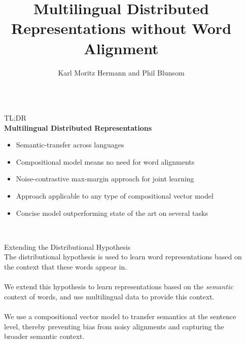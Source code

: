 \documentclass[final]{beamer}
\title{Multilingual Distributed Representations without Word Alignment} %
\author{Karl Moritz Hermann and Phil Blunsom} %
\institute{Department of Computer Science, University of Oxford} %
\newlength{\sepwid}
\newlength{\onecolwid}
\begin{document}

\setlength{\belowcaptionskip}{2ex} %
\setlength\belowdisplayshortskip{2ex} %

\renewcommand{\arraystretch}{1.2} %

\begin{frame}[t] %
  \begin{columns}[t] %
  \begin{column}{\sepwid}\end{column} %
    \begin{column}{\onecolwid} %
      \begin{alertblock}{TL;DR}
        ~\\
        \textbf{Multilingual Distributed Representations}
        \begin{itemize}
          \item Semantic-transfer across languages
          \item Compositional model means no need for word alignments
          \item Noise-contrastive max-margin approach for joint learning
          \item Approach applicable to any type of compositional vector model
          \item Concise model outperforming state of the art on several tasks
        \end{itemize}
        \vspace{0.5em}
      \end{alertblock}
        ~\\
      \begin{block}{Extending the Distributional Hypothesis}
        ~\\
        The distributional hypothesis is used to learn word representations
        based on the context that these words appear in.
        ~\\
        ~\\
        We extend this hypothesis to learn representations based on the
        \textit{semantic} context of words, and use multilingual data to provide this
        context.
        ~\\
        ~\\
        We use a compositional vector model to transfer semantics at the
        sentence level, thereby preventing bias from noisy alignments and
        capturing the broader semantic context.
        ~\\
        ~\\
      \end{block}


\end{column}
\end{columns}
\end{frame}
\end{document}
